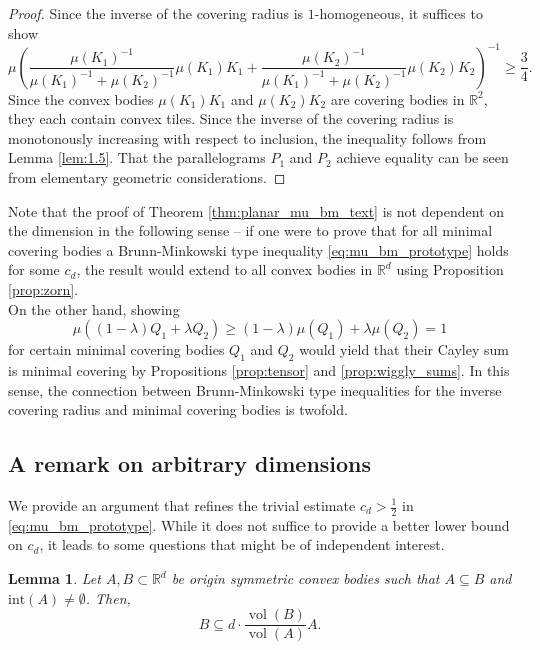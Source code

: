 \documentclass[11pt, a4paper]{amsart}
\newcommand{\RR}{\mathbb{R}}
\newcommand{\inter}{\mathrm{int}}
\DeclareMathOperator{\vol}{vol}
\numberwithin{equation}{section}
\theoremstyle{plain}
\newtheorem{lemma}[theorem]{Lemma}
\begin{document}
\begin{proof}
Since the inverse of the covering radius is $1$-homogeneous, it suffices to show 
\[\mu\left(\frac{\mu(K_1)^{-1}}{\mu(K_1)^{-1}+\mu(K_2)^{-1}} \mu(K_1)K_1+\frac{\mu(K_2)^{-1}}{\mu(K_1)^{-1}+\mu(K_2)^{-1}} \mu(K_2)K_2 \right)^{-1}\geq \frac{3}{4}.\]
Since the convex bodies $\mu(K_1)K_1$ and $\mu(K_2)K_2$ are covering bodies in $\RR^2$, they each contain convex tiles. Since the inverse of the covering radius is monotonously increasing with respect to inclusion, the inequality follows from Lemma \ref{lem:1.5}.
That the parallelograms $P_1$ and $P_2$ achieve equality can be seen from elementary geometric considerations.
\end{proof}

Note that the proof of Theorem \ref{thm:planar_mu_bm_text} is not dependent on the dimension in the following sense -- if one were to prove that for all minimal covering bodies a Brunn-Minkowski type inequality \eqref{eq:mu_bm_prototype} holds for some $c_d$, the result would extend to all convex bodies in $\RR^d$ using Proposition \ref{prop:zorn}.\\
On the other hand, showing 
\[
\mu((1-\lambda)Q_1+\lambda Q_2)\geq (1-\lambda)\mu(Q_1)+\lambda \mu(Q_2)=1\]
for certain minimal covering bodies $Q_1$ and $Q_2$  would yield that their Cayley sum is minimal covering by Propositions \ref{prop:tensor} and \ref{prop:wiggly_sums}. 
In this sense, the connection between Brunn-Minkowski type inequalities for the inverse covering radius and minimal covering bodies is twofold.
\subsection{A remark on arbitrary dimensions}

We provide an argument that refines the trivial estimate $c_d > \tfrac 12$ in \eqref{eq:mu_bm_prototype}. While it does not suffice to provide a better lower bound on $c_d$, it leads to some questions that might be of independent interest. 

\begin{lemma}
\label{lemma:inclusion}
Let $A,B\subset\RR^d$ be origin symmetric convex bodies such that $A\subseteq B$ and $\inter(A)\neq \emptyset$. Then,
\[
B\subseteq d\cdot \frac{\vol(B)}{\vol(A)} A.
\]
\end{lemma}
\end{document}

